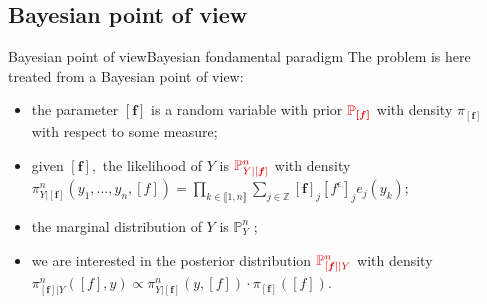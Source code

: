 \documentclass[10pt]{beamer}
\begin{document}
\subsection{Bayesian point of view}
\begin{frame}{Bayesian point of view}{Bayesian fondamental paradigm}
The problem is here treated from a Bayesian point of view:

\bigskip

\begin{itemize}
\setlength\itemsep{2em}
\item<1-> the parameter $\left[\boldsymbol{f}\right]$ is a random variable with \textcolor{red!90!black}{prior} $\textcolor{red!90!black}{\mathbb{P}_{\boldsymbol{\left[f\right]}}}$ with density $\pi_{\left[\boldsymbol{f}\right]}$ with respect to some measure;
\item<2-> given $\left[\boldsymbol{f}\right],$ the \textcolor{red!90!black}{likelihood} of $Y$ is $\textcolor{red!90!black}{\mathbb{P}_{Y \vert \left[\boldsymbol{f}\right]}^{n}}$ with density $\pi_{Y \vert \left[\boldsymbol{f}\right]}^{n}(y_{1}, \hdots, y_{n}, [f]) = \prod\limits_{k \in \llbracket 1, n \rrbracket}\sum\limits_{j \in \mathbb{Z}} \left[\boldsymbol{f}\right]_{j}\left[f^{\epsilon}\right]_{j} e_{j}(y_{k});$
\item<3-> the marginal distribution of $Y$ is $\mathbb{P}_{Y}^{n}$ ;
\item<4-> we are interested in the \textcolor{red!90!black}{posterior distribution} $\textcolor{red!90!black}{\mathbb{P}_{\left[\boldsymbol{f}\right] \vert Y}^{n}}$ with density $\pi_{\left[\boldsymbol{f}\right] \vert Y}^{n}([f], y)\propto \pi_{Y \vert \left[\boldsymbol{f}\right]}^{n}(y, [f]) \cdot \pi_{\left[\boldsymbol{f}\right]}([f]).$
\end{itemize}
\end{frame}
\end{document}
